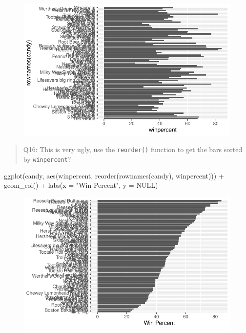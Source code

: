 \documentclass[
  letterpaper,
  DIV=11,
  numbers=noendperiod]{scrartcl}
\newenvironment{Shaded}{\begin{snugshade}}{\end{snugshade}}
\newcommand{\AttributeTok}[1]{\textcolor[rgb]{0.40,0.45,0.13}{#1}}
\newcommand{\ConstantTok}[1]{\textcolor[rgb]{0.56,0.35,0.01}{#1}}
\newcommand{\FunctionTok}[1]{\textcolor[rgb]{0.28,0.35,0.67}{#1}}
\newcommand{\NormalTok}[1]{\textcolor[rgb]{0.00,0.23,0.31}{#1}}
\newcommand{\SpecialCharTok}[1]{\textcolor[rgb]{0.37,0.37,0.37}{#1}}
\newcommand{\StringTok}[1]{\textcolor[rgb]{0.13,0.47,0.30}{#1}}
\begin{document}
\begin{figure}[H]

{\centering \includegraphics{halloween-mini-project_files/figure-pdf/unnamed-chunk-15-1.pdf}

}

\end{figure}

\begin{quote}
Q16: This is very ugly, use the \texttt{reorder()} function to get the
bars sorted by \texttt{winpercent}?
\end{quote}

\begin{Shaded}
\begin{Highlighting}[]
\FunctionTok{ggplot}\NormalTok{(candy, }\FunctionTok{aes}\NormalTok{(winpercent, }\FunctionTok{reorder}\NormalTok{(}\FunctionTok{rownames}\NormalTok{(candy), winpercent))) }\SpecialCharTok{+} 
  \FunctionTok{geom\_col}\NormalTok{() }\SpecialCharTok{+} 
  \FunctionTok{labs}\NormalTok{(}\AttributeTok{x =} \StringTok{"Win Percent"}\NormalTok{, }\AttributeTok{y =} \ConstantTok{NULL}\NormalTok{)}
\end{Highlighting}
\end{Shaded}

\begin{figure}[H]

{\centering \includegraphics{halloween-mini-project_files/figure-pdf/unnamed-chunk-16-1.pdf}

}

\end{figure}
\end{document}
